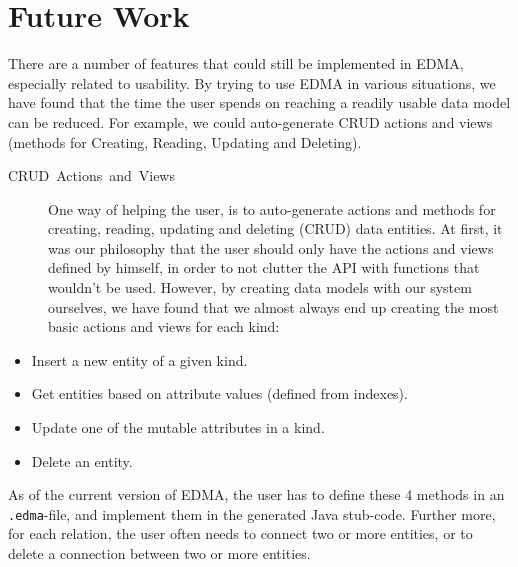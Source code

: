 
\section{Future Work}

There are a number of features that could still be implemented in
EDMA, especially related to usability. By trying to use EDMA in various
situations, we have found that the time the user spends on reaching
a readily usable data model can be reduced. For example, we could
auto-generate CRUD actions and views (methods for Creating, Reading,
Updating and Deleting).
\begin{description}
\item [{CRUD~Actions~and~Views}] One way of helping the user, is to
auto-generate actions and methods for creating, reading, updating
and deleting (CRUD) data entities. At first, it was our philosophy
that the user should only have the actions and views defined by himself,
in order to not clutter the API with functions that wouldn't be used.
However, by creating data models with our system ourselves, we have
found that we almost always end up creating the most basic actions
and views for each kind:\end{description}
\begin{itemize}
\item Insert a new entity of a given kind.
\item Get entities based on attribute values (defined from indexes).
\item Update one of the mutable attributes in a kind.
\item Delete an entity.
\end{itemize}
As of the current version of EDMA, the user has to define these 4
methods in an \texttt{.edma}-file, and implement them in the generated
Java stub-code. Further more, for each relation, the user often needs
to connect two or more entities, or to delete a connection between
two or more entities.

